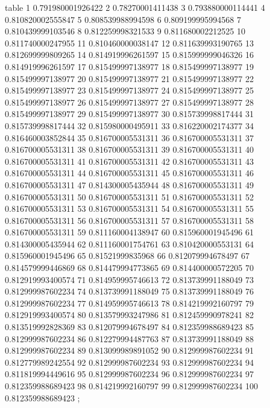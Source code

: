 table {%
	1 0.791980001926422
	2 0.78270001411438
	3 0.793880000114441
	4 0.810820002555847
	5 0.808539988994598
	6 0.809199995994568
	7 0.810439999103546
	8 0.812259998321533
	9 0.811680002212525
	10 0.811740000247955
	11 0.810460000038147
	12 0.811639993190765
	13 0.812699999809265
	14 0.814919996261597
	15 0.815999999046326
	16 0.814919996261597
	17 0.815499997138977
	18 0.815499997138977
	19 0.815499997138977
	20 0.815499997138977
	21 0.815499997138977
	22 0.815499997138977
	23 0.815499997138977
	24 0.815499997138977
	25 0.815499997138977
	26 0.815499997138977
	27 0.815499997138977
	28 0.815499997138977
	29 0.815499997138977
	30 0.815739998817444
	31 0.815739998817444
	32 0.815980000495911
	33 0.816220002174377
	34 0.816460003852844
	35 0.816700005531311
	36 0.816700005531311
	37 0.816700005531311
	38 0.816700005531311
	39 0.816700005531311
	40 0.816700005531311
	41 0.816700005531311
	42 0.816700005531311
	43 0.816700005531311
	44 0.816700005531311
	45 0.816700005531311
	46 0.816700005531311
	47 0.814300005435944
	48 0.816700005531311
	49 0.816700005531311
	50 0.816700005531311
	51 0.816700005531311
	52 0.816700005531311
	53 0.816700005531311
	54 0.816700005531311
	55 0.816700005531311
	56 0.816700005531311
	57 0.816700005531311
	58 0.816700005531311
	59 0.811160004138947
	60 0.815960001945496
	61 0.814300005435944
	62 0.811160001754761
	63 0.810420000553131
	64 0.815960001945496
	65 0.81521999835968
	66 0.812079994678497
	67 0.814579999446869
	68 0.814479994773865
	69 0.814400000572205
	70 0.812919993400574
	71 0.814959995746613
	72 0.813739991188049
	73 0.812999987602234
	74 0.813739991188049
	75 0.813739991188049
	76 0.812999987602234
	77 0.814959995746613
	78 0.814219992160797
	79 0.812919993400574
	80 0.813579993247986
	81 0.812459990978241
	82 0.813519992828369
	83 0.812079994678497
	84 0.812359988689423
	85 0.812999987602234
	86 0.812279994487763
	87 0.813739991188049
	88 0.812999987602234
	89 0.813099989891052
	90 0.812999987602234
	91 0.812779989242554
	92 0.812999987602234
	93 0.812999987602234
	94 0.811819994449616
	95 0.812999987602234
	96 0.812999987602234
	97 0.812359988689423
	98 0.814219992160797
	99 0.812999987602234
	100 0.812359988689423
};

